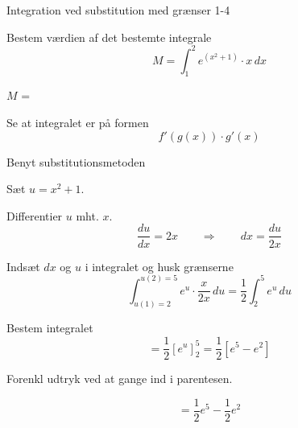 \documentclass{article}
\begin{document}
\begin{exercise}{Integration ved substitution med grænser 1-4}
	
	
	Bestem værdien af det bestemte integrale
	\[
	M = \int_1^2 e^{(x^2+1)} \cdot x \, dx
	\]

	
	$M$ =  \\
	
	
	
	\hint
	
	Se at integralet er på formen
	\[
	f'(g(x)) \cdot g'(x)
	\]
	
	\hint
	
	Benyt substitutionsmetoden
	
	\hint
	
	Sæt $u=x^2+1$.
	
	
	\hint
	
	Differentier $u$ mht. $x$.
	\[
	\frac{du}{dx} = 2x \qquad	\Rightarrow \qquad dx = \frac{du}{2x}
	\]
	
	\hint
	
	Indsæt $dx$ og $u$ i integralet og husk grænserne
	\[
	\int_{u(1)=2}^{u(2)=5} e^{u} \cdot \frac{x}{2x} \, du = \frac{1}{2} \int_2^5 e^u \, du
	\]
	
	\hint
	
	Bestem integralet
	\[
	= \frac{1}{2} \left[ e^u \right]_2^5 = \frac{1}{2} \left[ e^5 - e^2  \right]
	\]
	
	\hint
	Forenkl udtryk ved at gange ind i parentesen.
	
	\hint
	
	\[
	= \frac{1}{2} e^5 - \frac{1}{2} e^2
	\]
	
\end{exercise}

\newpage
\end{document}
